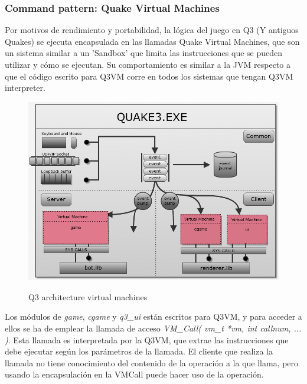 \documentclass[a4paper,12pt]{report}
\begin{document}

	\subsubsection{Command pattern: Quake Virtual Machines}
	
	Por motivos de rendimiento y portabilidad, la lógica del juego en Q3 (Y antiguos Quakes) se ejecuta encapsulada en las llamadas Quake Virtual Machines, que son un sistema similar a un 'Sandbox' que limita las instrucciones que se pueden utilizar y cómo se ejecutan. Su comportamiento es similar a la JVM respecto a que el código escrito para Q3VM corre en todos los sistemas que tengan Q3VM interpreter. \cite{q3vm}\\
	
	\begin{center}
		\begin{figure}[h]
			\includegraphics[width=1\textwidth]{images/q3_workspace_architecture}
			\label{fig:q3vm}
			\caption{Q3 architecture virtual machines}
		\end{figure}
	\end{center}
	
	Los módulos de \textit{game}, \textit{cgame} y \textit{q3\_ui} están escritos para Q3VM, y para acceder a ellos se ha de emplear la llamada de acceso \textit{VM\_Call( vm\_t *vm, int callnum, ... )}. Esta llamada es interpretada por la Q3VM, que extrae las instrucciones que debe ejecutar según los parámetros de la llamada. El cliente que realiza la llamada no tiene conocimiento del contenido de la operación a la que llama, pero usando la encapsulación en la VMCall puede hacer uso de la operación.\\
	
\end{document}
